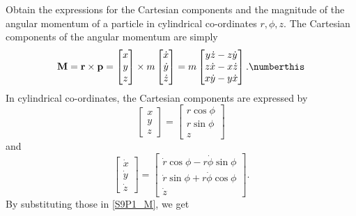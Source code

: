 
\begin{problem}[title={Angular momentum in cylindrical co-ordinates}]
{
Obtain the expressions for the Cartesian components and the magnitude of the angular momentum of a particle in cylindrical co-ordinates $r,\phi,z$.
}
{
The Cartesian components of the angular momentum are simply
\begin{equation*}
    \mathbf{M} = \mathbf{r} \times \mathbf{p} = \begin{bmatrix} x \\ y \\ z \end{bmatrix} \times m \begin{bmatrix} \Dot{x} \\ \Dot{y} \\ \Dot{z} \end{bmatrix} = m \begin{bmatrix} y \Dot{z} - z \Dot{y} \\ z \Dot{x} - x \Dot{z} \\ x \Dot{y} - y \Dot{x} \end{bmatrix} . \numberthis \label{S9P1_M}
\end{equation*}
In cylindrical co-ordinates, the Cartesian components are expressed by
\begin{equation*}
    \begin{bmatrix} x \\ y \\ z \end{bmatrix} = \begin{bmatrix} r \cos{\phi} \\ r \sin{\phi} \\ z \end{bmatrix}
\end{equation*}
and
\begin{equation*}
    \begin{bmatrix} \Dot{x} \\ \Dot{y} \\ \Dot{z} \end{bmatrix} = \begin{bmatrix} \Dot{r}\cos{\phi} - r\Dot{\phi}\sin{\phi} \\ \Dot{r}\sin{\phi} + r\Dot{\phi}\cos{\phi} \\ \Dot{z} \end{bmatrix}.
\end{equation*}
By substituting those in \eqref{S9P1_M}, we get
\begin{align*}

\end{align*}}
\end{problem}

